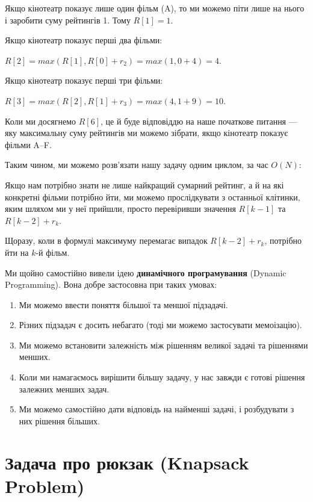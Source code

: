 \documentclass[12pt,a4paper]{report}
\begin{document}
Якщо кінотеатр показує лише один фільм (A), то ми можемо піти лише на нього і заробити суму рейтингів 1. Тому \(R[1] = 1\).

Якщо кінотеатр показує перші два фільми:

\(R[2] = max(R[1], R[0] + r_2) = max(1, 0 + 4) = 4\).

Якщо кінотеатр показує перші три фільми:

\(R[3] = max(R[2], R[1] + r_3) = max(4, 1 + 9) = 10\).

Коли ми досягнемо \(R[6]\), це й буде відповіддю на наше початкове питання --- яку максимальну суму рейтингів ми можемо зібрати, якщо кінотеатр показує фільми A--F.

Таким чином, ми можемо розв’язати нашу задачу одним циклом, за час \(O(N)\):



Якщо нам потрібно знати не лише найкращий сумарний рейтинг, а й на які конкретні фільми потрібно йти, ми можемо прослідкувати з останньої клітинки, яким шляхом ми у неї прийшли, просто перевіривши значення \(R[k - 1]\) та \(R[k - 2] + r_k\).

Щоразу, коли в формулі максимуму перемагає випадок \(R[k - 2] + r_k\), потрібно йти на \(k\)-й фільм.



Ми щойно самостійно вивели ідею \textbf{динамічного програмування} (Dynamic Programming). Вона добре застосовна при таких умовах:

\begin{enumerate}
    \item Ми можемо ввести поняття більшої та меншої підзадачі.
    \item Різних підзадач є досить небагато (тоді ми можемо застосувати мемоізацію).
    \item Ми можемо встановити залежність між рішенням великої задачі та рішеннями менших.
    \item Коли ми намагаємось вирішити більшу задачу, у нас завжди є готові рішення залежних менших задач.
    \item Ми можемо самостійно дати відповідь на найменші задачі, і розбудувати з них рішення більших.
\end{enumerate}



\section{Задача про рюкзак (Knapsack Problem)}
\end{document}
